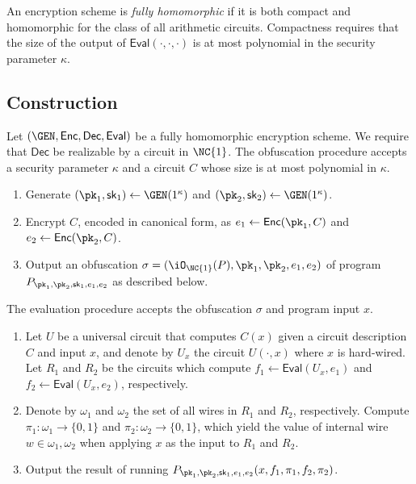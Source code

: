 \documentclass[12pt]{tufte-book}
\newcommand{\Enc}{\mathsf{Enc}}
\newcommand{\Dec}{\mathsf{Dec}}
\newcommand{\Eval}{\mathsf{Eval}}
\begin{document}
\begin{definition}
An encryption scheme is \emph{fully homomorphic} if it is both compact
and homomorphic for the class of all arithmetic circuits.
Compactness requires that the size of the output of $\Eval(\cdot, \cdot,
\cdot)$ is at most polynomial in the security parameter $\kappa$.
\end{definition}

\subsection{Construction}



\newcommand{\prog}[1]{\ensuremath{P_{\pk_1,\pk_2,\sk_{#1},e_1,e_2}}}

Let $(\GEN, \Enc, \Dec, \Eval)$ be a fully homomorphic encryption
scheme.
We require that $\Dec$ be realizable by a circuit in $\NC{1}$.
The obfuscation procedure accepts a security parameter $\kappa$ and
a circuit $C$ whose size is at most polynomial in $\kappa$.
\begin{enumerate}
\item
	Generate $(\pk_1, \sk_1) \gets \GEN(1^\kappa)$ and
	$(\pk_2, \sk_2) \gets \GEN(1^\kappa)$.
\item
	Encrypt $C$, encoded in canonical form, as
	$e_1 \gets \Enc(\pk_1, C)$ and $e_2 \gets \Enc(\pk_2, C)$.
\item
	Output an obfuscation
	$\sigma = (\iO_{\NC{1}}(P), \pk_1, \pk_2, e_1, e_2)$
	of program $\prog{1}$ as described below.
\end{enumerate}

The evaluation procedure accepts the obfuscation $\sigma$ and program
input $x$.
\begin{enumerate}
\item
	Let $U$ be a universal circuit that computes $C(x)$ given a
	circuit description $C$ and input $x$, and denote by $U_x$ the
	circuit $U(\cdot, x)$ where $x$ is hard-wired.
	Let $R_1$ and $R_2$ be the circuits which compute
	$f_1 \gets \Eval(U_x, e_1)$ and $f_2 \gets \Eval(U_x, e_2)$,
	respectively.

\item
	Denote by $\omega_1$ and $\omega_2$ the set of all wires in $R_1$
	and $R_2$, respectively.
	Compute $\pi_1 : \omega_1 \to \{ 0, 1 \}$ and
	$\pi_2 : \omega_2 \to \{ 0, 1 \}$, which yield the value of internal
	wire $w \in \omega_1, \omega_2$ when applying $x$ as the input
	to $R_1$ and $R_2$.

\item
	Output the result of running $\prog{1}(x, f_1, \pi_1, f_2, \pi_2)$.
\end{enumerate}
\end{document}
